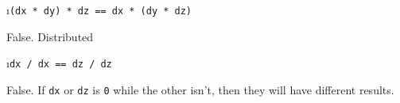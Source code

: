 \documentclass[fleqn]{article}
\begin{document}
\i \texttt{(dx * dy) * dz == dx * (dy * dz)}

 \begin{solution}
   False. Distributed 
 \end{solution}

\i \texttt{dx / dx == dz / dz}

 \begin{solution}
   False. If \texttt{dx} or \texttt{dz} is \texttt{0} while the other isn't, then they will have different results.
 \end{solution}

\ene
\end{document}
